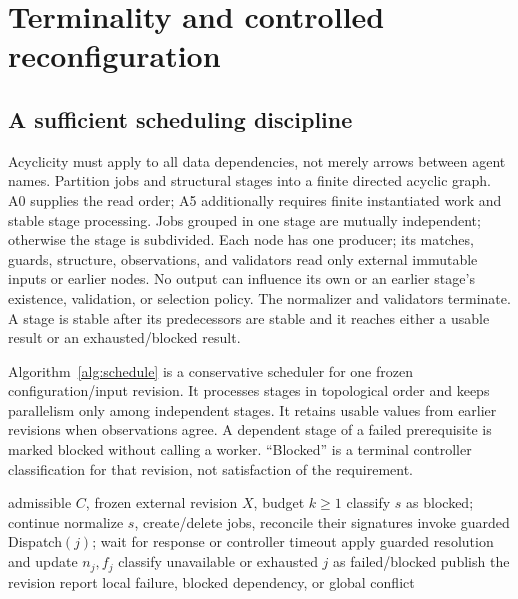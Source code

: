 \documentclass[pdflatex,sn-mathphys-num]{sn-jnl}
\theoremstyle{thmstyleone}
\theoremstyle{thmstylethree}
\theoremstyle{thmstyletwo}
\newcommand{\Pub}{\operatorname{Publishable}}
\begin{document}
\section{Terminality and controlled reconfiguration}\label{sec:progress}
\subsection{A sufficient scheduling discipline}
Acyclicity must apply to all data dependencies, not merely arrows between agent names. Partition jobs and structural stages into a finite directed acyclic graph. A0 supplies the read order; A5 additionally requires finite instantiated work and stable stage processing. Jobs grouped in one stage are mutually independent; otherwise the stage is subdivided. Each node has one producer; its matches, guards, structure, observations, and validators read only external immutable inputs or earlier nodes. No output can influence its own or an earlier stage's existence, validation, or selection policy. The normalizer and validators terminate. A stage is stable after its predecessors are stable and it reaches either a usable result or an exhausted/blocked result.

Algorithm~\ref{alg:schedule} is a conservative scheduler for one frozen configuration/input revision. It processes stages in topological order and keeps parallelism only among independent stages. It retains usable values from earlier revisions when observations agree. A dependent stage of a failed prerequisite is marked blocked without calling a worker. ``Blocked'' is a terminal controller classification for that revision, not satisfaction of the requirement.

\begin{algorithm}[H]
\caption{Topological repair of a stable revision}\label{alg:schedule}
\begin{algorithmic}[1]
\Require admissible $C$, frozen external revision $X$, budget $k\geq1$
    \State classify $s$ as blocked; continue
  \EndIf
  \State normalize $s$, create/delete jobs, reconcile their signatures
      \State invoke guarded Dispatch$(j)$; wait for response or controller timeout
      \State apply guarded resolution and update $n_j,f_j$
    \EndWhile
     \State classify unavailable or exhausted $j$ as failed/blocked \EndIf
  \EndFor
\EndFor
\If{$\Pub(S)$} \State publish the revision
\Else\State report local failure, blocked dependency, or global conflict
\EndIf
\end{algorithmic}
\end{algorithm}
\end{document}
